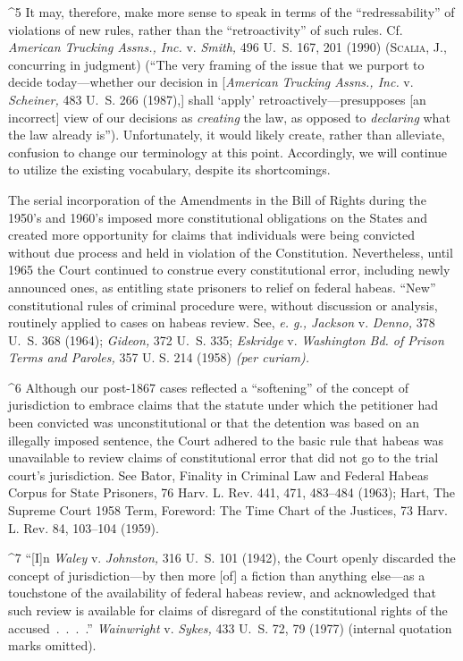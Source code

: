 ^5 It may, therefore, make more sense to speak in terms of the
``redressability'' of violations of new rules, rather than the
``retroactivity'' of such rules. Cf. \emph{American Trucking Assns.,
Inc.} v. \emph{Smith,} 496 U.~S. 167, 201 (1990) (\textsc{Scalia,} J.,
concurring in judgment) (``The very framing of the issue that we
purport to decide today---whether our decision in [\emph{American}
\emph{Trucking Assns., Inc.} v. \emph{Scheiner,} 483 U.~S. 266 (1987),]
shall ‘apply' retroactively---presupposes [an incorrect] view of
our decisions as \emph{creating} the law, as opposed to \emph{declaring}
what the law already is''). Unfortunately, it would likely create,
rather than alleviate, confusion to change our terminology at this
point. Accordingly, we will continue to utilize the existing vocabulary,
despite its shortcomings.

  The serial incorporation of the Amendments in the Bill of Rights
during the 1950's and 1960's imposed more constitutional obligations
on the States and created more opportunity for claims that individuals
were being convicted without due process and held in violation of the
Constitution. Nevertheless, until 1965 the Court continued to construe
every constitutional error, including newly announced ones, as entitling
state prisoners to relief on federal habeas. ``New'' constitutional
rules of criminal procedure were, without discussion or analysis,
routinely applied to cases on habeas review. \newpage  See, \emph{e. g.,
Jackson} v. \emph{Denno,} 378 U.~S. 368 (1964); \emph{Gideon,} 372 U.~S.
335; \emph{Eskridge} v. \emph{Washington Bd. of Prison Terms and Paroles,} 357
U. S. 214 (1958) \emph{(per curiam).}

^6 Although our post-1867 cases reflected a ``softening'' of the
concept of jurisdiction to embrace claims that the statute under
which the petitioner had been convicted was unconstitutional or that
the detention was based on an illegally imposed sentence, the Court
adhered to the basic rule that habeas was unavailable to review
claims of constitutional error that did not go to the trial court's
jurisdiction. See Bator, Finality in Criminal Law and Federal Habeas
Corpus for State Prisoners, 76 Harv. L. Rev. 441, 471, 483--484 (1963);
Hart, The Supreme Court 1958 Term, Foreword: The Time Chart of the
Justices, 73 Harv. L. Rev. 84, 103--104 (1959).

^7 ``[I]n \emph{Waley} v. \emph{Johnston,} 316 U.~S. 101 (1942),
the Court openly discarded the concept of jurisdiction---by then
more [of] a fiction than anything else---as a touchstone of the
availability of federal habeas review, and acknowledged that such review
is available for claims of disregard of the constitutional rights of the
accused~.~.~.~.'' \emph{Wainwright} v. \emph{Sykes,} 433 U.~S. 72, 79
(1977) (internal quotation marks omitted).


